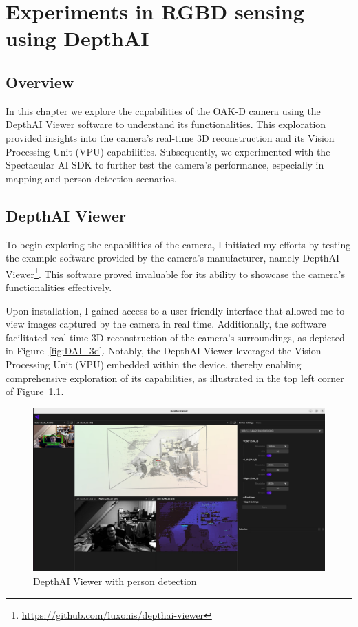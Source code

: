 \chapter{Experiments in RGBD sensing using DepthAI} \label{experiments_oak_d}

\section{Overview}

In this chapter we explore the capabilities of the OAK-D camera using the DepthAI Viewer software to understand its functionalities. This exploration provided insights into the camera's real-time 3D reconstruction and its Vision Processing Unit (VPU) capabilities. Subsequently, we experimented with the Spectacular AI SDK to further test the camera's performance, especially in mapping and person detection scenarios.


\section{DepthAI Viewer}

To begin exploring the capabilities of the camera, I initiated my efforts by testing the example software provided by the camera's manufacturer, namely DepthAI Viewer\footnote{\url{https://github.com/luxonis/depthai-viewer}}. This software proved invaluable for its ability to showcase the camera's functionalities effectively.

Upon installation, I gained access to a user-friendly interface that allowed me to view images captured by the camera in real time. Additionally, the software facilitated real-time 3D reconstruction of the camera's surroundings, as depicted in Figure~\ref{fig:DAI_3d}. Notably, the DepthAI Viewer leveraged the Vision Processing Unit (VPU) embedded within the device, thereby enabling comprehensive exploration of its capabilities, as illustrated in the top left corner of Figure~\ref{fig:DAI_person_detection}.

\FloatBarrier
\begin{figure}[htbp]
	\centering
	\includegraphics[width=150mm, keepaspectratio]{figures_jpg/depthai_viewer.jpg}
	\caption{DepthAI Viewer with person detection}
	\label{fig:DAI_person_detection}
\end{figure}


